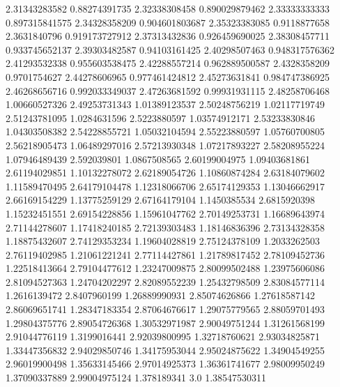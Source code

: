   2.31343283582    0.88274391735
  2.32338308458   0.890029879462
  2.33333333333   0.897315841575
  2.34328358209   0.904601803687
  2.35323383085     0.9118877658
   2.3631840796   0.919173727912
  2.37313432836   0.926459690025
  2.38308457711   0.933745652137
  2.39303482587    0.94103161425
  2.40298507463   0.948317576362
  2.41293532338   0.955603538475
  2.42288557214   0.962889500587
   2.4328358209     0.9701754627
  2.44278606965   0.977461424812
  2.45273631841   0.984747386925
  2.46268656716   0.992033349037
  2.47263681592    0.99931931115
  2.48258706468    1.00660527326
  2.49253731343    1.01389123537
  2.50248756219    1.02117719749
  2.51243781095     1.0284631596
   2.5223880597    1.03574912171
  2.53233830846    1.04303508382
  2.54228855721    1.05032104594
  2.55223880597    1.05760700805
  2.56218905473    1.06489297016
  2.57213930348    1.07217893227
  2.58208955224    1.07946489439
    2.592039801     1.0867508565
  2.60199004975    1.09403681861
  2.61194029851    1.10132278072
  2.62189054726    1.10860874284
  2.63184079602    1.11589470495
  2.64179104478    1.12318066706
  2.65174129353    1.13046662917
  2.66169154229    1.13775259129
  2.67164179104     1.1450385534
   2.6815920398    1.15232451551
  2.69154228856    1.15961047762
  2.70149253731    1.16689643974
  2.71144278607    1.17418240185
  2.72139303483    1.18146836396
  2.73134328358    1.18875432607
  2.74129353234    1.19604028819
  2.75124378109     1.2033262503
  2.76119402985    1.21061221241
  2.77114427861    1.21789817452
  2.78109452736    1.22518413664
  2.79104477612    1.23247009875
  2.80099502488    1.23975606086
  2.81094527363    1.24704202297
  2.82089552239    1.25432798509
  2.83084577114     1.2616139472
   2.8407960199    1.26889990931
  2.85074626866    1.27618587142
  2.86069651741    1.28347183354
  2.87064676617    1.29075779565
  2.88059701493    1.29804375776
  2.89054726368    1.30532971987
  2.90049751244    1.31261568199
  2.91044776119     1.3199016441
  2.92039800995    1.32718760621
  2.93034825871    1.33447356832
  2.94029850746    1.34175953044
  2.95024875622    1.34904549255
  2.96019900498    1.35633145466
  2.97014925373    1.36361741677
  2.98009950249    1.37090337889
  2.99004975124      1.378189341
            3.0    1.38547530311

